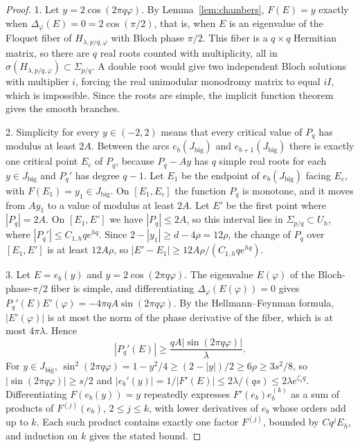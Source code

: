 \begin{proof}
1. Let $y=2\cos(2\pi q\varphi)$. By Lemma~\ref{lem:chambers}, $F(E)=y$ exactly when $\Delta_\varphi(E)=0=2\cos(\pi/2)$, that is, when $E$ is an eigenvalue of the Floquet fiber of $H_{\lambda,p/q,\varphi}$ with Bloch phase $\pi/2$. This fiber is a $q\times q$ Hermitian matrix, so there are $q$ real roots counted with multiplicity, all in $\sigma(H_{\lambda,p/q,\varphi})\subset\Sigma_{p/q}$. A double root would give two independent Bloch solutions with multiplier $i$, forcing the real unimodular monodromy matrix to equal $iI$, which is impossible. Since the roots are simple, the implicit function theorem gives the smooth branches.

2. Simplicity for every $y\in(-2,2)$ means that every critical value of $P_q$ has modulus at least $2A$. Between the arcs $e_b(J_{\mathrm{big}})$ and $e_{b+1}(J_{\mathrm{big}})$ there is exactly one critical point $E_c$ of $P_q$, because $P_q-Ay$ has $q$ simple real roots for each $y\in J_{\mathrm{big}}$ and $P_q'$ has degree $q-1$. Let $E_1$ be the endpoint of $e_b(J_{\mathrm{big}})$ facing $E_c$, with $F(E_1)=y_1\in J_{\mathrm{big}}$. On $[E_1,E_c]$ the function $P_q$ is monotone, and it moves from $Ay_1$ to a value of modulus at least $2A$. Let $E'$ be the first point where $|P_q|=2A$. On $[E_1,E']$ we have $|P_q|\le2A$, so this interval lies in $\Sigma_{p/q}\subset U_h$, where $|P_q'|\le C_{1,h}qe^{hq}$. Since $2-|y_1|\ge d-4\rho=12\rho$, the change of $P_q$ over $[E_1,E']$ is at least $12A\rho$, so $|E'-E_1|\ge12A\rho/(C_{1,h}qe^{hq})$.

3. Let $E=e_b(y)$ and $y=2\cos(2\pi q\varphi)$. The eigenvalue $E(\varphi)$ of the Bloch-phase-$\pi/2$ fiber is simple, and differentiating $\Delta_\varphi(E(\varphi))=0$ gives $P_q'(E)E'(\varphi)=-4\pi qA\sin(2\pi q\varphi)$. By the Hellmann--Feynman formula, $|E'(\varphi)|$ is at most the norm of the phase derivative of the fiber, which is at most $4\pi\lambda$. Hence
\begin{equation}\label{eq:Pprime}
|P_q'(E)|\ge\frac{qA|\sin(2\pi q\varphi)|}{\lambda}.
\end{equation}
For $y\in J_{\mathrm{big}}$, $\sin^2(2\pi q\varphi)=1-y^2/4\ge(2-|y|)/2\ge6\rho\ge3s^2/8$, so $|\sin(2\pi q\varphi)|\ge s/2$ and $|e_b'(y)|=1/|F'(E)|\le2\lambda/(qs)\le2\lambda e^{\zeta_1q}$. Differentiating $F(e_b(y))=y$ repeatedly expresses $F'(e_b)e_b^{(k)}$ as a sum of products of $F^{(j)}(e_b)$, $2\le j\le k$, with lower derivatives of $e_b$ whose orders add up to $k$. Each such product contains exactly one factor $F^{(j)}$, bounded by $C q^jE_h$, and induction on $k$ gives the stated bound.
\end{proof}


